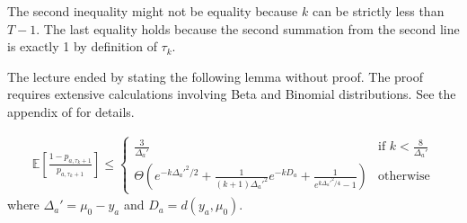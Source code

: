 \documentclass[11pt]{article}
\begin{document}
The second inequality might not be equality because $k$ can be strictly less than $T-1$. The last equality holds because the second summation from the second line is exactly 1 by definition of $\tau_k$. 

The lecture ended by stating the following lemma without proof. The
proof requires extensive calculations involving Beta and Binomial
distributions. See the appendix of \cite{agrawal2013further} for details. 

\begin{lemma}
\begin{align*}
    \mathbb{E} [\frac{1 - p_{a, \tau_k + 1}}{p_{a, \tau_k +1}} ] \leq 
    \begin{cases}
    \frac{3}{\Delta_a'} &\text{if } k < \frac{8}{\Delta_a'} \\
    \Theta(e^{-k\Delta_a'^2/2} + \frac{1}{(k+1)\Delta_a'^2}e^{-kD_a} + \frac{1}{e^{k\Delta_a'^2/4} -1}) & \text{otherwise}
    \end{cases}
\end{align*}
where $\Delta_a' = \mu_0 - y_a$ and $D_a = d(y_a, \mu_0)$.
\end{lemma}
		

\end{document}
